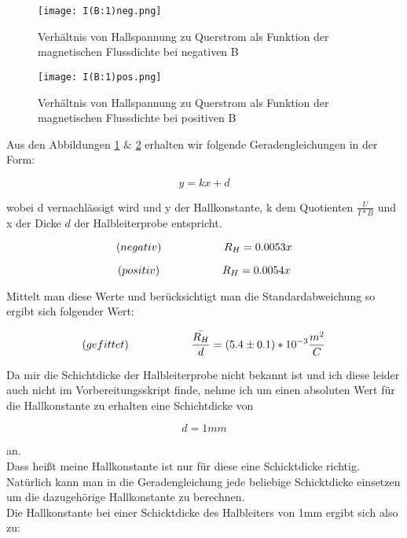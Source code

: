 \documentclass[12pt, a4paper]{article}
\begin{document}
\begin{figure}[!htpb]
    \centering
    \texttt{[image: I(B:1)neg.png]}
    \caption{Verhältnis von Hallspannung zu Querstrom als Funktion der magnetischen Flussdichte bei negativen B}
    \label{fig:hallneg}
\end{figure}

 
\begin{figure}[!htpb]
    \centering
    \texttt{[image: I(B:1)pos.png]}
    \caption{Verhältnis von Hallspannung zu Querstrom als Funktion der magnetischen Flussdichte bei positiven B}
    \label{fig:hallpos}
\end{figure}

Aus den Abbildungen \ref{fig:hallneg} $\&$ \ref{fig:hallpos} erhalten wir folgende Geradengleichungen in der Form:

\begin{equation*}
    y = kx + d
\end{equation*}

wobei d vernachlässigt wird und y der Hallkonstante, k dem Quotienten $\frac{U}{I*B}$ und x der Dicke $d$ der Halbleiterprobe entspricht.

\begin{equation*}
    (negativ) \hspace{2.0cm} R_H = 0.0053x
\end{equation*}

\begin{equation*}
    (positiv) \hspace{2.0cm} R_H = 0.0054x
\end{equation*}

Mittelt man diese Werte und berücksichtigt man die Standardabweichung so ergibt sich folgender Wert:

\begin{equation*}
   (gefittet) \hspace{2.0cm} \Bar{\frac{R_H}{d}} = (5.4 \pm 0.1) *10^{-3} \frac{m^2}{C}
\end{equation*}


Da mir die Schichtdicke der Halbleiterprobe nicht bekannt ist und ich diese leider auch nicht im Vorbereitungsskript finde, nehme ich um einen absoluten Wert für die Hallkonstante zu erhalten eine Schichtdicke von

\begin{equation*}
    d = 1 mm
\end{equation*}

an.\\
Dass heißt meine Hallkonstante ist nur für diese eine Schicktdicke richtig. Natürlich kann man in die Geradengleichung jede beliebige Schicktdicke einsetzen um die dazugehörige Hallkonstante zu berechnen.
\\
Die Hallkonstante bei einer Schicktdicke des Halbleiters von 1mm ergibt sich also zu:
\end{document}

